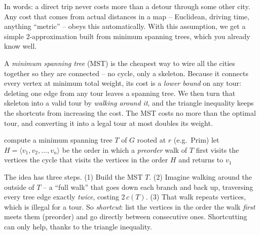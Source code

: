 In words: a direct trip never costs more than a detour through some other
city. Any cost that comes from actual distances in a map -- Euclidean,
driving time, anything ``metric'' -- obeys this automatically. With this
assumption, we get a simple $2$-approximation built from minimum spanning
trees, which you already know well.

\begin{intuitionbox}
A \emph{minimum spanning tree} (MST) is the cheapest way to wire all the
cities together so they are connected -- no cycle, only a skeleton. Because it
connects every vertex at minimum total weight, its cost is a \emph{lower bound}
on any tour: deleting one edge from any tour leaves a spanning tree. We then
turn that skeleton into a valid tour by \emph{walking around it}, and the
triangle inequality keeps the shortcuts from increasing the cost. The MST costs
no more than the optimal tour, and converting it into a legal tour at most
doubles its weight.
\end{intuitionbox}

\begin{algorithm}[H]
\caption{\textsc{Approx-TSP-Tour}$(G,c)$}
compute a minimum spanning tree $T$ of $G$ rooted at $r$ (e.g.\ Prim)\;
let $H = \langle v_1, v_2, \dots, v_n\rangle$ be the order in which a
  \emph{preorder} walk of $T$ first visits the vertices\;
\Return the cycle that visits the vertices in the order $H$ and returns to
  $v_1$\;
\end{algorithm}

The idea has three steps. (1) Build the MST $T$. (2) Imagine walking around
the outside of $T$ -- a ``full walk'' that goes down each branch and back up,
traversing every tree edge exactly \emph{twice}, costing $2\,c(T)$. (3) That
walk repeats vertices, which is illegal for a tour. So \emph{shortcut}: list
the vertices in the order the walk \emph{first} meets them (preorder) and go
directly between consecutive ones. Shortcutting can only help, thanks to the
triangle inequality.

